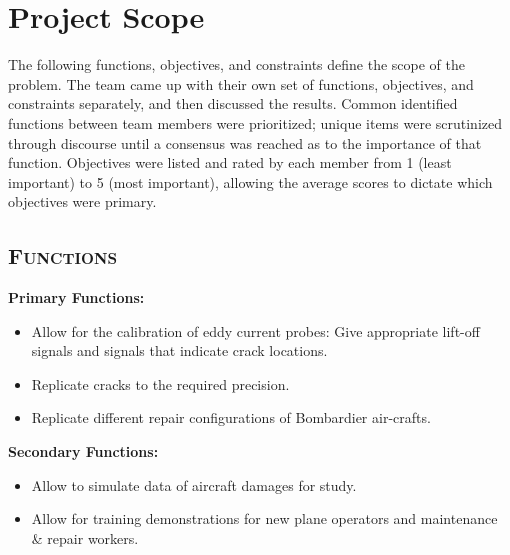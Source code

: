 \documentclass[12pt]{article}
\begin{document}
\section{Project Scope}

The following functions, objectives, and constraints define the scope of the problem. The team came up with their own set of functions, objectives, and constraints separately, and then discussed the results. Common identified functions between team members were prioritized; unique items were scrutinized through discourse until a consensus was reached as to the importance of that function. Objectives were listed and rated by each member from 1 (least important) to 5 (most important), allowing the average scores to dictate which objectives were primary. 

\subsection{\textsc{Functions} }

\textbf{Primary Functions:}

\begin{itemize}
\item Allow for the calibration of eddy current probes: Give appropriate lift-off signals and signals that indicate crack locations.
\item Replicate cracks to the required precision.
\item Replicate different repair configurations of Bombardier air-crafts.
\end{itemize}

\noindent
\textbf{Secondary Functions:}

\begin{itemize}
\item Allow to simulate data of aircraft damages for study.
\item Allow for training demonstrations for new plane operators and maintenance \& repair workers.
\end{itemize}
\end{document}

